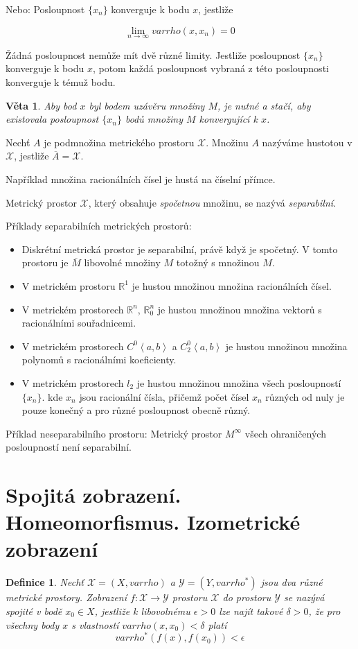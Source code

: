 \documentclass[a4paper, 11pt]{report}
\newtheorem{mydef}{Definice}[chapter]
\newtheorem{veta}{Věta}[chapter]
\begin{document}
Nebo: Posloupnost $\{x_n\}$ konverguje k bodu $x$, jestliže

$$\lim\limits_{n\to \infty} varrho(x, x_n) = 0 $$

Žádná posloupnost nemůže mít dvě různé limity. Jestliže posloupnost $\{x_n\}$ konverguje k bodu $x$, potom každá posloupnost vybraná z této posloupnosti konverguje k témuž bodu.

\begin{veta}
Aby bod $x$ byl bodem uzávěru množiny $M$, je nutné a stačí, aby existovala posloupnost $\{x_n\}$ bodů množiny $M$ konvergující k $x$.
\end{veta}

Nechť $A$ je podmnožina metrického prostoru $\mathcal{X}$. Množinu $A$ nazýváme hustotou v $\mathcal{X}$, jestliže $\overline{A} = \mathcal{X}$.

Například množina racionálních čísel je hustá na číselní přímce.

Metrický prostor $\mathcal{X}$, který obsahuje \emph{spočetnou} množinu, se nazývá \emph{separabilní}.

Příklady separabilních metrických prostorů:
\begin{itemize}
	\item Diskrétní metrická prostor je separabilní, právě když je spočetný. V tomto prostoru je $\overline{M}$ libovolné množiny $M$ totožný s množinou $M$.
	\item V metrickém prostoru $\mathbb{R}^1$ je hustou množinou množina racionálních čísel.
	\item V metrickém prostorech $\mathbb{R}^n$, $\mathbb{R}^n_0$ je hustou množinou množina vektorů s racionálními souřadnicemi.
	\item V metrickém prostorech $C^0\left<a, b\right>$ a $C_2^0\left<a, b\right>$ je hustou množinou množina polynomů s racionálními koeficienty.
	\item V metrickém prostorech $l_2$ je hustou množinou množina všech posloupností $\{x_n\}$. kde $x_n$ jsou racionální čísla, přičemž počet čísel $x_n$ různých od nuly je pouze konečný a pro různé posloupnost obecně různý.
\end{itemize}

Příklad neseparabilního prostoru: Metrický prostor $M^\infty$ všech ohraničených posloupností není separabilní.

\section{Spojitá zobrazení. Homeomorfismus. Izometrické zobrazení}
\begin{mydef}
Nechť $\mathcal{X} = (X, varrho)$ a $\mathcal{Y} = (Y, varrho^*)$ jsou dva různé metrické prostory. Zobrazení $f: \mathcal{X} \to \mathcal{Y}$ prostoru $\mathcal{X}$ do prostoru $\mathcal{Y}$ se nazývá spojité v bodě $x_0 \in X$, jestliže k libovolnému $\epsilon > 0$ lze najít takové $\delta > 0$, že pro všechny body $x$ s vlastností $varrho(x, x_0) < \delta$ platí
$$varrho^*(f(x), f(x_0)) < \epsilon$$
\end{mydef}
\end{document}

